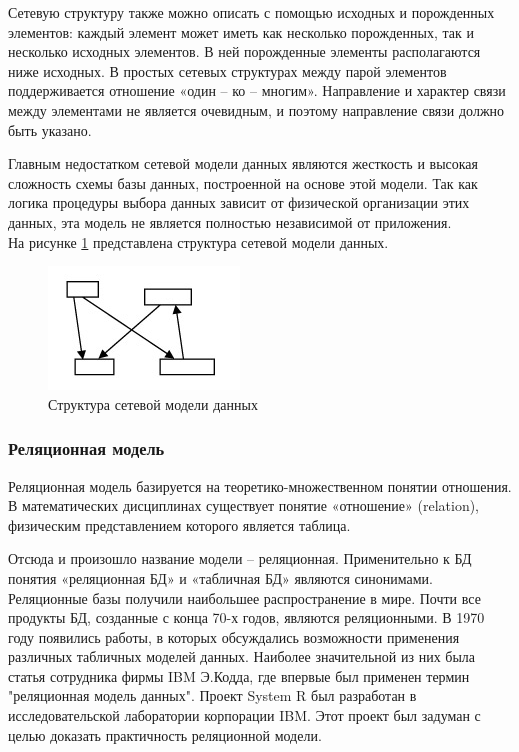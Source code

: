 \documentclass[12pt,a4paper,oneside]{report}
\begin{document}
Сетевую структуру также можно описать с помощью исходных и порожденных элементов: каждый элемент может иметь как несколько порожденных, так и несколько исходных элементов. В ней порожденные элементы располагаются ниже исходных. В простых сетевых структурах между парой элементов поддерживается отношение «один – ко – многим». Направление и характер связи между элементами не является очевидным, и поэтому направление связи должно быть указано\cite{seti}.

Главным недостатком сетевой модели данных являются жесткость и высокая сложность схемы базы данных, построенной на основе этой модели. Так как логика процедуры выбора данных зависит от физической организации этих данных, эта модель не является полностью независимой от приложения.\\

На рисунке \ref{ris:set} представлена структура сетевой модели данных.
\begin{figure}[h]
	\centering
	\includegraphics[scale=1]{2.png}
	\caption{Структура сетевой модели данных}
	\label{ris:set}
\end{figure}

\subsubsection{Реляционная модель}
\quad Реляционная модель базируется на теоретико-множественном понятии отношения. В математических дисциплинах существует понятие «отношение» (relation), физическим представлением которого является таблица.

Отсюда и произошло название модели – реляционная. Применительно к БД понятия «реляционная БД» и «табличная БД» являются синонимами. Реляционные базы получили наибольшее распространение в мире. Почти все продукты БД, созданные с конца 70-х годов, являются реляционными. В 1970 году появились работы, в которых обсуждались возможности применения различных табличных моделей данных. Наиболее значительной из них была статья сотрудника фирмы IBM Э.Кодда, где впервые был применен термин "реляционная модель данных". Проект System R был разработан в исследовательской лаборатории корпорации IBM. Этот
проект был задуман с целью доказать практичность реляционной модели.
 
\end{document}
